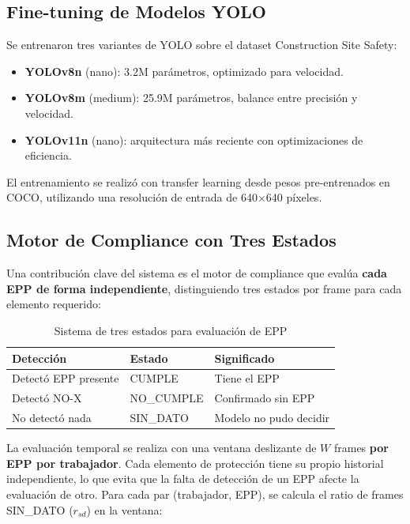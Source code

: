 \documentclass[conference, 10pt]{IEEEtran}
\begin{document}
\subsection{Fine-tuning de Modelos YOLO}

Se entrenaron tres variantes de YOLO sobre el dataset Construction Site Safety:

\begin{itemize}
    \item \textbf{YOLOv8n} (nano): 3.2M parámetros, optimizado para velocidad.
    \item \textbf{YOLOv8m} (medium): 25.9M parámetros, balance entre precisión y velocidad.
    \item \textbf{YOLOv11n} (nano): arquitectura más reciente con optimizaciones de eficiencia.
\end{itemize}

El entrenamiento se realizó con transfer learning desde pesos pre-entrenados en COCO, utilizando una resolución de entrada de 640$\times$640 píxeles.

\subsection{Motor de Compliance con Tres Estados}

Una contribución clave del sistema es el motor de compliance que evalúa \textbf{cada EPP de forma independiente}, distinguiendo tres estados por frame para cada elemento requerido:

\begin{table}[h]
\centering
\caption{Sistema de tres estados para evaluación de EPP}
\label{tab:tres_estados}
\begin{tabular}{@{}lll@{}}
\toprule
\textbf{Detección} & \textbf{Estado} & \textbf{Significado} \\
\midrule
Detectó EPP presente & CUMPLE & Tiene el EPP \\
Detectó NO-X & NO\_CUMPLE & Confirmado sin EPP \\
No detectó nada & SIN\_DATO & Modelo no pudo decidir \\
\bottomrule
\end{tabular}
\end{table}

La evaluación temporal se realiza con una ventana deslizante de $W$ frames \textbf{por EPP por trabajador}. Cada elemento de protección tiene su propio historial independiente, lo que evita que la falta de detección de un EPP afecte la evaluación de otro. Para cada par (trabajador, EPP), se calcula el ratio de frames SIN\_DATO ($r_{sd}$) en la ventana:
\end{document}
